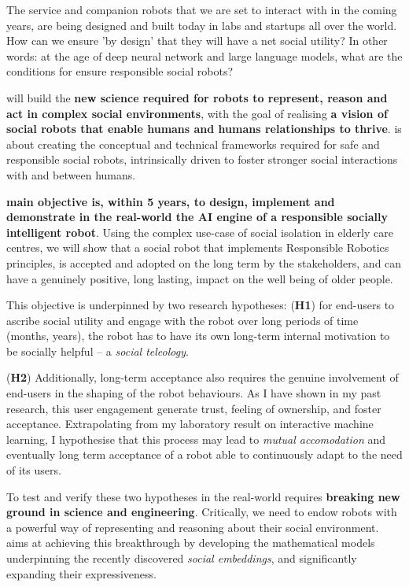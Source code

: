 The service and companion robots that we are set to interact with in the coming
years, are being designed and built today in labs and startups all over the
world. How can we ensure 'by design' that they will have a net social utility?
In other words: at the age of deep neural network and large language models,
what are the conditions for ensure responsible social robots?

\project will build the \textbf{new science required for robots to represent, reason and
act in complex social environments}, with the goal of realising \textbf{a vision
of social robots that enable humans and humans relationships to thrive}.
\project is about creating the conceptual and technical frameworks required for
safe and responsible social robots, intrinsically driven to foster stronger
social interactions with and between humans.

\textbf{\project main objective is, within 5
years, to design, implement and demonstrate in the real-world the AI engine of a
responsible socially intelligent robot}. Using the complex use-case of social
isolation in elderly care centres, we will show that a social robot that
implements Responsible Robotics principles, is accepted and adopted on the long
term by the stakeholders, and can have a genuinely positive, long lasting,
impact on the well being of older people.

This objective is underpinned by two research hypotheses: (\textbf{H1}) for
end-users to ascribe social utility and engage with the robot over long periods
of time (months, years), the robot has to have its own long-term internal
motivation to be socially helpful -- a \emph{social teleology}.

(\textbf{H2}) Additionally, long-term acceptance also requires the
genuine involvement of end-users in the shaping of the robot behaviours. As I
have shown in my past research, this user engagement generate trust, feeling of
ownership, and foster acceptance. Extrapolating from my laboratory result on
interactive machine learning, I hypothesise that this process may lead to
\emph{mutual accomodation} and eventually long term acceptance of a robot able
to continuously adapt to the need of its users.

To test and verify these two hypotheses in the real-world requires
\textbf{breaking new ground in science and engineering}. Critically, we need to
endow robots with a powerful way of representing and reasoning about their
social environment.  \project aims at achieving this breakthrough by developing
the mathematical models underpinning the recently discovered \emph{social
embeddings}, and significantly expanding their expressiveness.

